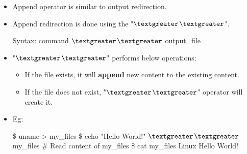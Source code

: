 \setlength{\columnsep}{3pt}
\begin{flushleft}
	\begin{itemize}
		\item Append operator is similar to output redirection.
		\item Append redirection is done using the "\textbf{{$\textgreater$}}\textbf{{$\textgreater$}}".
		\bigskip
		\begin{tcolorbox}[breakable,notitle,boxrule=-0pt,colback=pink,colframe=pink]
			\color{black}
			\font=9pt
			Syntax: command \textbf{{$\textgreater$}}\textbf{{$\textgreater$}} output\_file
			\font=4pt
		\end{tcolorbox}
	
		\item "\textbf{{$\textgreater$}}\textbf{{$\textgreater$}}" performs below operations:
		\begin{itemize}
			\item If the file exists, it will \textbf{append} new content to the existing content.
			\item If the file does not exist, "\textbf{{$\textgreater$}}\textbf{{$\textgreater$}}" operator will create it.
		\end{itemize}
	
		\item 	Eg:
		\begin{tcolorbox}[breakable,notitle,boxrule=-0pt,colback=black,colframe=black]
			\color{green}
			\font=9pt
			\$ uname > my\_files 
			\newline
			\$ echo "Hello World!" \textbf{{$\textgreater$}}\textbf{{$\textgreater$}} my\_files 			
			\newline
			\newline
			\color{yellow}
			\# Read content of my\_files
			\color{green}
			\newline
			\color{green}
			\$ cat my\_files    
			\newline
			\color{white}
			Linux 
			\newline
			\color{white}
			Hello World!
			\font=4pt
		\end{tcolorbox}
		
		
	\end{itemize}

	
\end{flushleft}

